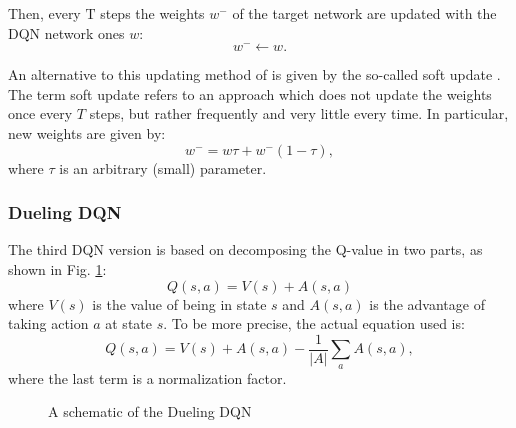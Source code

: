 \documentclass[a4paper, 12pt]{article}
\numberwithin{equation}{section}
\begin{document}
Then, every $\mathrm{T}$ steps the weights $w^-$ of the target network are updated with the DQN network ones $w$:
\begin{equation}
	w^-\leftarrow w.
\end{equation}

An alternative to this updating method of is given by the so-called soft update \cite{soft-update}. The term soft update refers to an approach which does not update the weights once every $T$ steps, but rather frequently and very little every time. In particular, new weights are given by:
\begin{equation}
	w^-=w\tau+w^-\left(1-\tau\right),
\end{equation}
where $\tau$ is an arbitrary (small) parameter.


\subsubsection{Dueling DQN}

The third DQN version is based on decomposing the Q-value in two parts, as shown in Fig. \ref{fig:dueling}:
\begin{equation}
	Q\left(s,a\right)=V\left(s\right)+A\left(s,a\right)
\end{equation}
where $V\left(s\right)$ is the value of being in state $s$ and $A\left(s,a\right)$ is the advantage of taking action $a$ at state $s$. To be more precise, the actual equation used is:
\begin{equation}
	Q\left(s,a\right)=V\left(s\right)+A\left(s,a\right)-\frac{1}{\left|A\right|}\sum_aA\left(s,a\right),
\end{equation}
where the last term is a normalization factor.

\begin{figure}[h]
	\centering
		\caption{A schematic of the Dueling DQN}
	\label{fig:dueling}
\end{figure}
\end{document}
